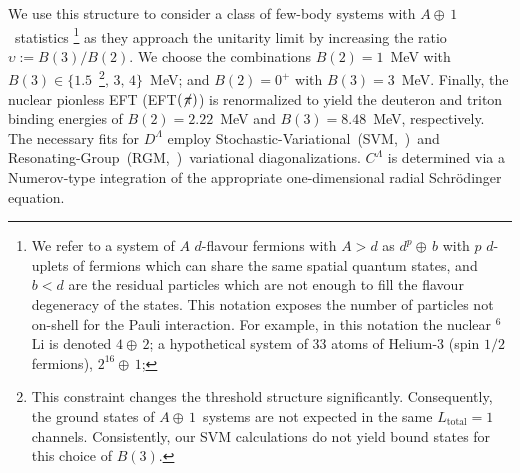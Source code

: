 \documentclass[aps,prl,onecolumn,groupedaddress,superscriptaddress]
{revtex4}
\newcommand{\abb}{\mbox{\ensuremath{A\oplus\,1}}}
\newcommand{\lec}{C^\Lambda}
\newcommand{\led}{D^\Lambda}
\newcommand{\eftnopi}{\mbox{EFT$(\not \! \pi)$}}
\begin{document}
We use this structure to consider a class of few-body systems with \abb~statistics
\footnote{We refer to a system of $A$ $d$-flavour fermions with $A>d$
as $d^p \oplus\,b$ with $p$ $d$-uplets of fermions which can share the same
spatial quantum states, and $b<d$ are the residual
particles which are not enough to fill the flavour degeneracy of the states.
This notation exposes the number of particles not on-shell
for the Pauli interaction.
For example, in this notation the nuclear $^6$Li is denoted $4 \oplus\,2$;
a hypothetical system of 33 atoms of Helium-3 (spin $1/2$ fermions),
$2^{16} \oplus\, 1$;}
as they approach the unitarity limit by
increasing the ratio
\mbox{$\upsilon:=B(3)/B(2)$}.
We choose the combinations $B(2)=1$~MeV with $B(3)\in\lbrace1.5$~\footnote{This constraint changes the
threshold structure significantly. Consequently, the ground states of \abb~systems are not expected in the
same $L_\text{total}=1$ channels. Consistently, our SVM calculations
do not yield bound states for this choice of $B(3)$.}$,\,3,\,4\rbrace$~MeV;
and $B(2)=0^+$ with $B(3)=3$~MeV.
Finally, the nuclear pionless EFT (\eftnopi) is renormalized to yield the
deuteron and triton binding energies of $B(2)=2.22$~MeV
and $B(3)=8.48$~MeV, respectively. 
The necessary fits for $\led$ employ Stochastic-Variational~(SVM,~\cite{Suzuki:1631377})~and
Resonating-Group~(RGM,~\cite{PhysRev.52.1083})~variational diagonalizations. $\lec$ is
determined via a Numerov-type integration of the appropriate one-dimensional
radial Schr\"odinger equation.

\vspace{4mm}
\end{document}
